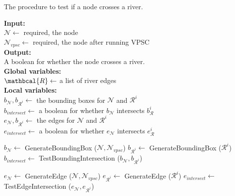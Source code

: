 \begin{algorithm}[tb!]
    \caption{The procedure to test if a node crosses a river.}\label{alg:check river crossing}
    \textbf{Input:} \\
    $ \mathcal{N} \gets $ required, the node \\
    $ \mathcal{N}_{vpsc} \gets $ required, the node after running VPSC \\

    \textbf{Output:} \\
    A boolean for whether the node crosses a river. \\

    \textbf{Global variables:} \\
    $ \mathbcal{R} \gets $ a list of river edges \\

    \textbf{Local variables:} \\
    $ b_\mathcal{N}, b_{\mathcal{R}^i} \gets $ the bounding boxes for $\mathcal{N}$ and $\mathcal{R}^i$ \\
    $ b_{intersect} \gets $ a boolean for whether $b_\mathcal{N}$ intersects $b_\mathcal{R}^i$ \\
    $ e_\mathcal{N}, b_{\mathcal{R}^i} \gets $ the edges for $\mathcal{N}$ and $\mathcal{R}^i$ \\
    $ e_{intersect} \gets $ a boolean for whether $e_\mathcal{N}$ intersects $e_\mathcal{R}^i$ \\

    \begin{algorithmic}[1]
        
            \State $ b_{\mathcal{N}} \gets $ GenerateBoundingBox ($ \mathcal{N}, \mathcal{N}_{vpsc} $)
            \State $ b_{\mathcal{R}^i} \gets $ GenerateBoundingBox ($ \mathcal{R}^i $)
            \State $ b_{intersect} \gets $ TestBoundingIntersection ($ b_{\mathcal{N}}, b_{\mathcal{R}^i} $)
            
                \State $ e_{\mathcal{N}} \gets $ GenerateEdge ($ \mathcal{N}, \mathcal{N}_{vpsc} $)
                \State $ e_{\mathcal{R}^i} \gets $ GenerateEdge ($ \mathcal{R}^i $)
                \State $ e_{intersect} \gets $ TestEdgeIntersection ($ e_\mathcal{N}, e_{\mathcal{R}^i} $)
                
                    \State {}
                \EndIf
            
                \EndIf
        \EndFor
        
        \State {}
        \EndProcedure
    \end{algorithmic}
\end{algorithm}

